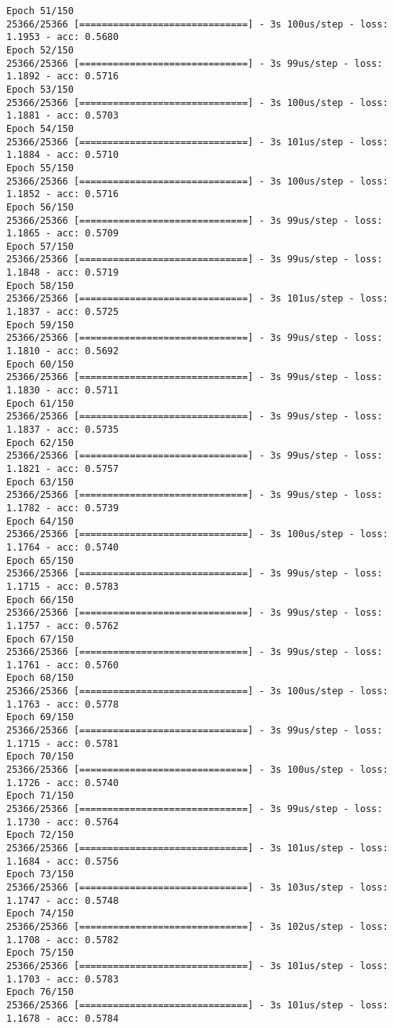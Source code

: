 \documentclass[11pt]{article}
\begin{document}
\begin{Verbatim}[commandchars=\\\{\}]
Epoch 51/150
25366/25366 [==============================] - 3s 100us/step - loss: 1.1953 - acc: 0.5680
Epoch 52/150
25366/25366 [==============================] - 3s 99us/step - loss: 1.1892 - acc: 0.5716
Epoch 53/150
25366/25366 [==============================] - 3s 100us/step - loss: 1.1881 - acc: 0.5703
Epoch 54/150
25366/25366 [==============================] - 3s 101us/step - loss: 1.1884 - acc: 0.5710
Epoch 55/150
25366/25366 [==============================] - 3s 100us/step - loss: 1.1852 - acc: 0.5716
Epoch 56/150
25366/25366 [==============================] - 3s 99us/step - loss: 1.1865 - acc: 0.5709
Epoch 57/150
25366/25366 [==============================] - 3s 99us/step - loss: 1.1848 - acc: 0.5719
Epoch 58/150
25366/25366 [==============================] - 3s 101us/step - loss: 1.1837 - acc: 0.5725
Epoch 59/150
25366/25366 [==============================] - 3s 99us/step - loss: 1.1810 - acc: 0.5692
Epoch 60/150
25366/25366 [==============================] - 3s 99us/step - loss: 1.1830 - acc: 0.5711
Epoch 61/150
25366/25366 [==============================] - 3s 99us/step - loss: 1.1837 - acc: 0.5735
Epoch 62/150
25366/25366 [==============================] - 3s 99us/step - loss: 1.1821 - acc: 0.5757
Epoch 63/150
25366/25366 [==============================] - 3s 99us/step - loss: 1.1782 - acc: 0.5739
Epoch 64/150
25366/25366 [==============================] - 3s 100us/step - loss: 1.1764 - acc: 0.5740
Epoch 65/150
25366/25366 [==============================] - 3s 99us/step - loss: 1.1715 - acc: 0.5783
Epoch 66/150
25366/25366 [==============================] - 3s 99us/step - loss: 1.1757 - acc: 0.5762
Epoch 67/150
25366/25366 [==============================] - 3s 99us/step - loss: 1.1761 - acc: 0.5760
Epoch 68/150
25366/25366 [==============================] - 3s 100us/step - loss: 1.1763 - acc: 0.5778
Epoch 69/150
25366/25366 [==============================] - 3s 99us/step - loss: 1.1715 - acc: 0.5781
Epoch 70/150
25366/25366 [==============================] - 3s 100us/step - loss: 1.1726 - acc: 0.5740
Epoch 71/150
25366/25366 [==============================] - 3s 99us/step - loss: 1.1730 - acc: 0.5764
Epoch 72/150
25366/25366 [==============================] - 3s 101us/step - loss: 1.1684 - acc: 0.5756
Epoch 73/150
25366/25366 [==============================] - 3s 103us/step - loss: 1.1747 - acc: 0.5748
Epoch 74/150
25366/25366 [==============================] - 3s 102us/step - loss: 1.1708 - acc: 0.5782
Epoch 75/150
25366/25366 [==============================] - 3s 101us/step - loss: 1.1703 - acc: 0.5783
Epoch 76/150
25366/25366 [==============================] - 3s 101us/step - loss: 1.1678 - acc: 0.5784

\end{Verbatim}
\end{document}
